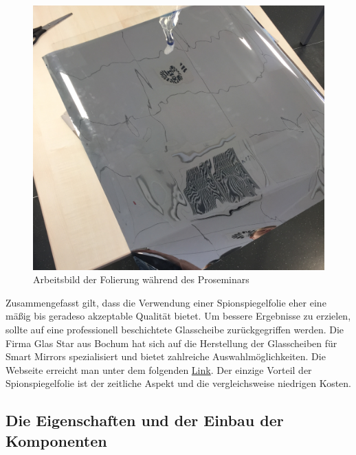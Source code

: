 \begin{figure}
	\begin{center}
		\includegraphics[scale=0.07]{bilder/spionspiegel.jpg}
	\end{center}
	\caption{Arbeitsbild der Folierung während des Proseminars}
	\vspace{-10pt}
\end{figure}

Zusammengefasst gilt, dass die Verwendung einer Spionspiegelfolie eher eine mäßig bis geradeso akzeptable Qualität bietet. Um bessere Ergebnisse zu erzielen, sollte auf eine professionell beschichtete Glasscheibe zurückgegriffen werden. Die Firma Glas Star aus Bochum hat sich auf die Herstellung der Glasscheiben für Smart Mirrors spezialisiert und bietet zahlreiche Auswahlmöglichkeiten. Die Webseite erreicht man unter dem folgenden \href{https://www.glas-star.de/spionspiegelnachmass/chrome-spy-spiegel/}{Link}. Der einzige Vorteil der Spionspiegelfolie ist der zeitliche Aspekt und die vergleichsweise niedrigen Kosten.

\subsection{Die Eigenschaften und der Einbau der Komponenten}
